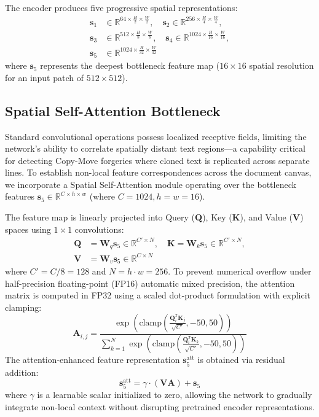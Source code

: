 \documentclass[pdflatex,sn-mathphys-num,iicol]{sn-jnl}
\begin{document}
The encoder produces five progressive spatial representations:
\begin{align}
\mathbf{s}_1 &\in \mathbb{R}^{64 \times \frac{H}{2} \times \frac{W}{2}}, \quad \mathbf{s}_2 \in \mathbb{R}^{256 \times \frac{H}{4} \times \frac{W}{4}}, \nonumber \\
\mathbf{s}_3 &\in \mathbb{R}^{512 \times \frac{H}{8} \times \frac{W}{8}}, \quad \mathbf{s}_4 \in \mathbb{R}^{1024 \times \frac{H}{16} \times \frac{W}{16}}, \nonumber \\
\mathbf{s}_5 &\in \mathbb{R}^{1024 \times \frac{H}{32} \times \frac{W}{32}}\label{eq_features}
\end{align}
where $\mathbf{s}_5$ represents the deepest bottleneck feature map ($16 \times 16$ spatial resolution for an input patch of $512 \times 512$).

\subsection{Spatial Self-Attention Bottleneck}\label{subsec4_3}
Standard convolutional operations possess localized receptive fields, limiting the network's ability to correlate spatially distant text regions---a capability critical for detecting Copy-Move forgeries where cloned text is replicated across separate lines. To establish non-local feature correspondences across the document canvas, we incorporate a Spatial Self-Attention module \cite{bib15} operating over the bottleneck features $\mathbf{s}_5 \in \mathbb{R}^{C \times h \times w}$ (where $C = 1024, h = w = 16$).

The feature map is linearly projected into Query ($\mathbf{Q}$), Key ($\mathbf{K}$), and Value ($\mathbf{V}$) spaces using $1 \times 1$ convolutions:
\begin{align}
\mathbf{Q} &= \mathbf{W}_q \mathbf{s}_5 \in \mathbb{R}^{C' \times N}, \quad \mathbf{K} = \mathbf{W}_k \mathbf{s}_5 \in \mathbb{R}^{C' \times N}, \nonumber \\
\mathbf{V} &= \mathbf{W}_v \mathbf{s}_5 \in \mathbb{R}^{C \times N}\label{eq_qkv}
\end{align}
where $C' = C / 8 = 128$ and $N = h \cdot w = 256$. To prevent numerical overflow under half-precision floating-point (FP16) automatic mixed precision, the attention matrix is computed in FP32 using a scaled dot-product formulation with explicit clamping:
\begin{equation}
\mathbf{A}_{i, j} = \frac{\exp\left(\text{clamp}\left(\frac{\mathbf{Q}_i^T \mathbf{K}_j}{\sqrt{C'}}, -50, 50\right)\right)}{\sum_{k=1}^N \exp\left(\text{clamp}\left(\frac{\mathbf{Q}_i^T \mathbf{K}_k}{\sqrt{C'}}, -50, 50\right)\right)}\label{eq_attn_matrix}
\end{equation}
The attention-enhanced feature representation $\mathbf{s}_5^{\text{att}}$ is obtained via residual addition:
\begin{equation}
\mathbf{s}_5^{\text{att}} = \gamma \cdot (\mathbf{V} \mathbf{A}) + \mathbf{s}_5\label{eq_attn_res}
\end{equation}
where $\gamma$ is a learnable scalar initialized to zero, allowing the network to gradually integrate non-local context without disrupting pretrained encoder representations.
\end{document}
